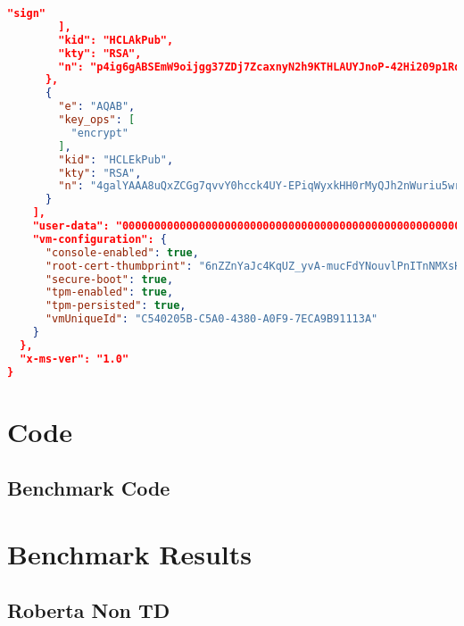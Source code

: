 \begin{lstlisting}[language=json]
          "sign"
        ],
        "kid": "HCLAkPub",
        "kty": "RSA",
        "n": "p4ig6gABSEmW9oijgg37ZDj7ZcaxnyN2h9KTHLAUYJnoP-42Hi209p1RdiL3HSWdRzzSDuXKjQw2kzlmcX1XfBq9-3-L-CVoyCvpiin-6k9L_Rbu0upEiBnIw2IzJ5N6EZx7zfX8vdh76MMnT-_U2Pd2psoiUufzNvs2-5d0QB5NyTuCnXbWD_yWb1OQWZAPioXEIyR13ic-FxPt5UiGG6kBjGp41rqlEQ0B_tsfn3e19_lTx76wVfEkEOw5Yq60rTyNuxiOnR59reaxXui0qJTOkoiDOJ-tHLffY_jTT-8EUFtWS1mcPoye2uKRhAI99xjTWg88Ft4sIUv8stOTvw"
      },
      {
        "e": "AQAB",
        "key_ops": [
          "encrypt"
        ],
        "kid": "HCLEkPub",
        "kty": "RSA",
        "n": "4galYAAA8uQxZCGg7qvvY0hcck4UY-EPiqWyxkHH0rMyQJh2nWuriu5wrh4JPPy6HvtX5M-mr5ecHPYf4S0qTOcqWZX01Uj8Ky1sbvA6g1GELe0Jdqf9piQDmS90dGwR6PItHMObnejzBocweHxkuSm7pGSuOAniX6KDid1hsxED5gYLxg2wHAXFICz9UZOTQ6FZmezVz0Krpr2AF4fKawOIaQSwNl7GIjH09x7rFRP2H1zOW6sJYAIAIT7F7vfncB3ZpPHUrU9U-qSQC2LZBRtjuBaKG-kGU6jAOkMC8aXu_pb99vgrrJpn2Nf8VodePJ7gzwladZjCnflyUWViYw"
      }
    ],
    "user-data": "00000000000000000000000000000000000000000000000000000000000000000000000000000000000000000000000000000000000000000000000000000000",
    "vm-configuration": {
      "console-enabled": true,
      "root-cert-thumbprint": "6nZZnYaJc4KqUZ_yvA-mucFdYNouvlPnITnNMXsHl-0",
      "secure-boot": true,
      "tpm-enabled": true,
      "tpm-persisted": true,
      "vmUniqueId": "C540205B-C5A0-4380-A0F9-7ECA9B91113A"
    }
  },
  "x-ms-ver": "1.0"
}
\end{lstlisting}

\section{Code}

\subsection{Benchmark Code}



\section{Benchmark Results}
\subsection{Roberta Non TD}
\label{sec:appendix:benchmarks:roberta}

